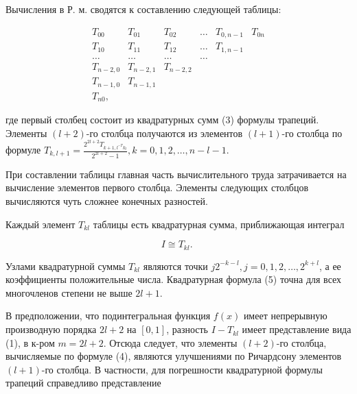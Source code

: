 \documentclass[10pt]{article}
\begin{document}
Вычисления в Р. м. сводятся к составлению следующей таблицы:



\[

\begin{array}{rrrrrr}

T_{00} & T_{01} & T_{02} & \ldots & T_{0, n-1} & T_{0 n} \\

T_{10} & T_{11} & T_{12} & \ldots & T_{1, n-1} & \\

\ldots & \ldots & \ldots & \ldots & & \\

T_{n-2,0} & T_{n-2,1} & T_{n-2,2} & & & \\

T_{n-1,0} & T_{n-1,1} & & & & \\

T_{n 0}, & & & & &

\end{array}

\]



где первый столбец состоит из квадратурных сумм (3) формулы трапеций. Элементы $(l+2)$-го столбца получаются из элементов $(l+1)$-го столбца по формуле $T_{k, l+1}=\frac{2^{2 l+2} T_{k+1, l^{-T} k_{l}}}{2^{2 l+2}-1}, k=0,1,2, \ldots, n-l-1$.



При составлении таблицы главная часть вычислительного труда затрачивается на вычисление элементов первого столбца. Элементы следующих столбцов вычисляются чуть сложнее конечных разностей.



Каждый элемент $T_{k l}$ таблицы есть квадратурная сумма, приближающая интеграл



\[

I \cong T_{k l} \text {. }

\]



Узлами квадратурной суммы $T_{k l}$ являются точки $j 2^{-k-l}, j=0,1,2, \ldots, 2^{k+l}$, а ее коэффициенты положительные числа. Квадратурная формула (5) точна для всех многочленов степени не выше $2 l+1$.



В предположении, что подинтегральная функция $f(x)$ имеет непрерывную производную порядка $2 l+2$ на $[0,1]$, разность $I-T_{k l}$ имеет представление вида (1), в к-ром $m=2 l+2$. Отсюда следует, что элементы $(l+2)$-го столбца, вычисляемые по формуле (4), являются улучшениями по Ричардсону элементов $(l+1)$-го столбца. В частности, для погрешности квадратурной формулы трапеций справедливо представление
\end{document}
